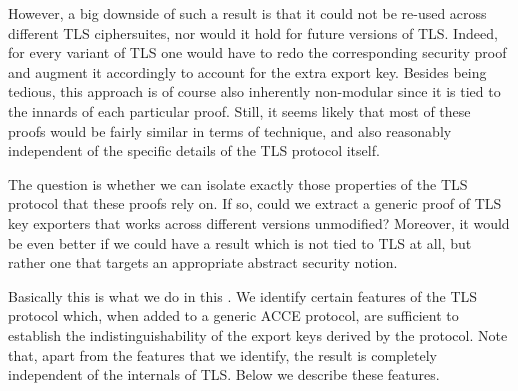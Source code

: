 However,
a big downside of such a result is that it could not be re-used across different TLS ciphersuites,
nor would it hold for future versions of TLS. 
Indeed, for every variant of TLS one would have to redo the corresponding security proof and augment it accordingly to account for the extra export key.
Besides being tedious,
this approach is of course also inherently non-modular since it is tied to the innards of each particular proof.
Still,
it seems likely that most of these proofs would be fairly similar in terms of technique,
and also reasonably independent of the specific details of the TLS protocol itself.  

The question is whether we can isolate exactly those properties of the TLS protocol that these proofs rely on.
If so, could we extract a generic proof of TLS key exporters that works across different versions unmodified?
Moreover,
it would be even better if we could have a result which is not tied to TLS at all,
but rather one that targets an appropriate abstract security notion.

Basically this is what we do in this .
We identify certain features of the TLS protocol which,
when added to a generic ACCE protocol,
are sufficient to establish the indistinguishability of the export keys derived by the protocol.
Note that,
apart from the features that we identify,
the result is completely independent of the internals of TLS. 
Below we describe these features.
%

%
